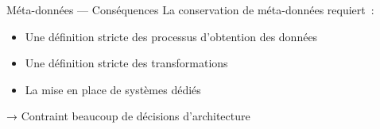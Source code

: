 \begin{frame}{Méta-données — Conséquences}
  La conservation de méta-données requiert~:

  \begin{itemize}
    \item Une définition stricte des processus d'obtention des données
    \item Une définition stricte des transformations
    \item La mise en place de systèmes dédiés
  \end{itemize}

  → Contraint beaucoup de décisions d'architecture
\end{frame}

